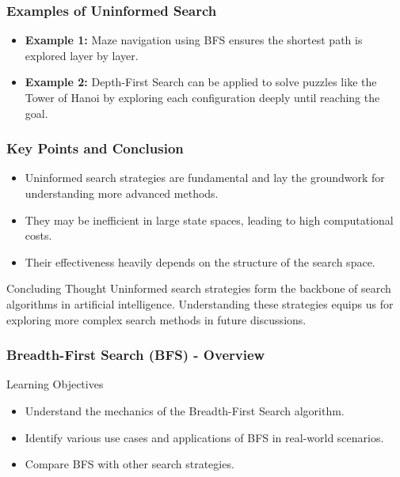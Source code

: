 \documentclass[aspectratio=169]{beamer}
\begin{document}
\begin{frame}[fragile]
    \frametitle{Examples of Uninformed Search}
    \begin{itemize}
        \item \textbf{Example 1:} Maze navigation using BFS ensures the shortest path is explored layer by layer.
        \item \textbf{Example 2:} Depth-First Search can be applied to solve puzzles like the Tower of Hanoi by exploring each configuration deeply until reaching the goal.
    \end{itemize}
\end{frame}

\begin{frame}[fragile]
    \frametitle{Key Points and Conclusion}
    \begin{itemize}
        \item Uninformed search strategies are fundamental and lay the groundwork for understanding more advanced methods.
        \item They may be inefficient in large state spaces, leading to high computational costs.
        \item Their effectiveness heavily depends on the structure of the search space.
    \end{itemize}
    \begin{block}{Concluding Thought}
        Uninformed search strategies form the backbone of search algorithms in artificial intelligence. Understanding these strategies equips us for exploring more complex search methods in future discussions.
    \end{block}
\end{frame}

\begin{frame}[fragile]
    \frametitle{Breadth-First Search (BFS) - Overview}
    \begin{block}{Learning Objectives}
        \begin{itemize}
            \item Understand the mechanics of the Breadth-First Search algorithm.
            \item Identify various use cases and applications of BFS in real-world scenarios.
            \item Compare BFS with other search strategies.
        \end{itemize}
    \end{block}
\end{frame}
\end{document}
